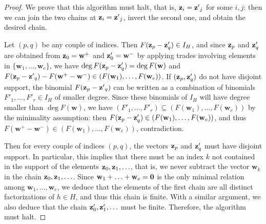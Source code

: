 \documentclass[11pt,twoside]{amsart}
\def\bw{{\mathbf w}}
\theoremstyle{definition}
\numberwithin{equation}{section}
\begin{document}
\begin{proof}
We prove that this algorithm must halt, that is, ${\bf z}_i = {\bf z'}_j$ for some $i,j$:
then we can join the two chains at ${\bf z}_i = {\bf z'}_j$, invert the second one, and obtain the desired chain.


Let $(p,q)$ be any couple of indices. Then $F({\bf z}_p-{\bf z}'_q) \in I_H$, and since ${\bf z}_p$ and ${\bf z}'_q$ are obtained from ${\bf z}_0=\bw^+$ and ${\bf z}'_0=\bw^-$ 
by applying trades involving elements in $\{\bw_1,\ldots,\bw_e\}$, we have $\deg F({\bf z}_p-{\bf z}'_q) = \deg F(\bw)$ and $F({\bf z}_p-{\bf z'}_q)-F(\bw^+-\bw^-) \in (F(\bw_1),\ldots,F(\bw_e))$. 
If $({\bf z}_p,{\bf z}'_q)$ do not have disjoint support, the binomial $F({\bf z}_p-{\bf z'}_q)$ can be written as a combination of binomials $F'_1,\ldots,F'_r \in I_H$ of smaller degree. Since these binomials of $I_H$ will have degree smaller than $\deg F(\bw)$, we have $(F'_1,\ldots,F'_r) \subseteq (F(\bw_1),\ldots,F(\bw_e))$ by the minimality assumption: then $F({\bf z}_p-{\bf z}'_q) \in (F(\bw_1),\ldots,F(\bw_e))$, and thus $F(\bw^+-\bw^-) \in (F(\bw_1),\ldots,F(\bw_e))$, contradiction.

Then for every couple of indices $(p,q)$, the vectors ${\bf z}_p$ and ${\bf z}'_q$ must have disjoint support. In particular, this implies that there must be an index $k$ not contained in the support of the elements ${\bf z}_0,{\bf z}_1,\ldots$, that is, we never subtract the vector $\bw_k$ in the chain ${\bf z}_0,{\bf z}_1, \ldots$.
Since $\bw_1+\ldots+\bw_e={\bf 0}$ is the only minimal relation among $\bw_1,\ldots,\bw_e$, we deduce that the elements of the first chain are all distinct factorizations of $h \in H$, and thus this chain is finite. With a similar argument, we also deduce that the chain ${\bf z}'_0,{\bf z}'_1,\ldots$ must be finite. Therefore, the algorithm must halt. 
\end{proof}
\end{document}
